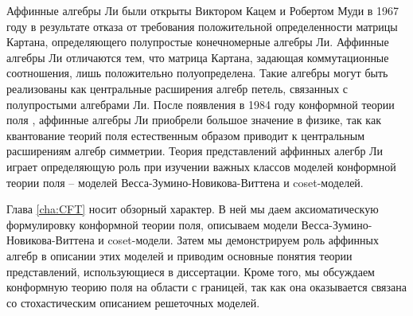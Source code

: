 \intro

%
%



Аффинные алгебры Ли были открыты Виктором Кацем \cite{kac1968simple} и Робертом Муди \cite{moody1968new} в 1967 году в результате отказа от требования положительной определенности матрицы Картана, определяющего полупростые конечномерные алгебры Ли. Аффинные алгебры Ли отличаются тем, что матрица Картана, задающая коммутационные соотношения, лишь положительно полуопределена. Такие алгебры могут быть реализованы как центральные расширения алгебр петель, связанных с полупростыми алгебрами Ли.  После появления в 1984 году конформной теории поля \cite{belavin1984ics}, аффинные алгебры Ли приобрели большое значение в физике, так как квантование теорий поля естественным образом приводит к центральным расширениям алгебр симметрии. Теория представлений аффинных алегбр Ли играет определяющую роль при изучении важных классов моделей конформной теории поля -- моделей Весса-Зумино-Новикова-Виттена и coset-моделей. 




\actualitysection
\actualitytext


 \noveltysection
 \noveltytext


\resultssection
\resultstext

\approbationsection
\approbationtext

\pubsection
\pubtext


\structsection
\structtext


Глава \ref{cha:CFT} носит обзорный характер. В ней мы даем аксиоматическую формулировку конформной теории поля, описываем модели Весса-Зумино-Новикова-Виттена и coset-модели. Затем мы демонстрируем роль аффинных алгебр в описании этих моделей и приводим основные понятия теории представлений, использующиеся в диссертации. Кроме того, мы обсуждаем конформную теорию поля на области с границей, так как она оказывается связана со стохастическим описанием решеточных моделей. 

